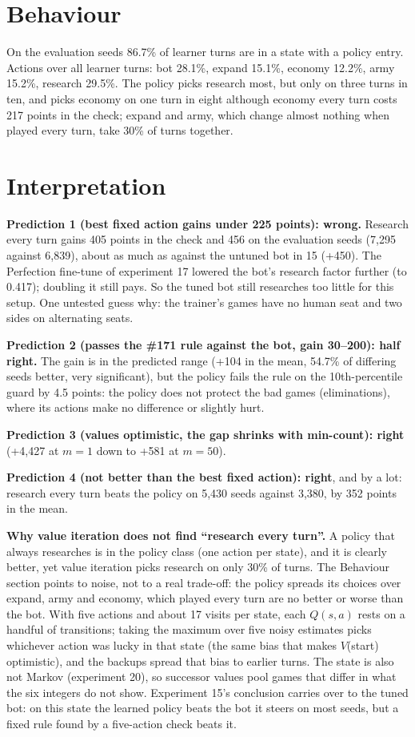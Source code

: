 \documentclass{../polyexp}
\begin{document}
\section{Behaviour}
On the evaluation seeds 86.7\% of learner turns are in a state with a policy entry. Actions over all learner turns:
bot 28.1\%, expand 15.1\%, economy 12.2\%, army 15.2\%, research 29.5\%. The policy picks research most, but only on
three turns in ten, and picks economy on one turn in eight although economy every turn costs 217 points in the
check; expand and army, which change almost nothing when played every turn, take 30\% of turns together.

\section{Interpretation}
\textbf{Prediction 1 (best fixed action gains under 225 points): wrong.} Research every turn gains 405 points in
the check and 456 on the evaluation seeds (7{,}295 against 6{,}839), about as much as against the untuned bot in 15
(+450). The Perfection fine-tune of experiment 17 lowered the bot's research factor further (to 0.417); doubling it
still pays. So the tuned bot still researches too little for this setup. One untested guess why: the trainer's
games have no human seat and two sides on alternating seats.

\textbf{Prediction 2 (passes the \#171 rule against the bot, gain 30--200): half right.} The gain is in the
predicted range (+104 in the mean, 54.7\% of differing seeds better, very significant), but the policy fails the
rule on the 10th-percentile guard by 4.5 points: the policy does not protect the bad games (eliminations), where
its actions make no difference or slightly hurt.

\textbf{Prediction 3 (values optimistic, the gap shrinks with min-count): right} (+4{,}427 at $m=1$ down to +581 at
$m=50$).

\textbf{Prediction 4 (not better than the best fixed action): right}, and by a lot: research every turn beats the
policy on 5{,}430 seeds against 3{,}380, by 352 points in the mean.

\textbf{Why value iteration does not find ``research every turn''.} A policy that always researches is in the
policy class (one action per state), and it is clearly better, yet value iteration picks research on only 30\% of
turns. The Behaviour section points to noise, not to a real trade-off: the policy spreads its choices over expand,
army and economy, which played every turn are no better or worse than the bot. With five actions and about 17
visits per state, each $Q(s,a)$ rests on a handful of transitions; taking the maximum over five noisy estimates
picks whichever action was lucky in that state (the same bias that makes $V$(start) optimistic), and the backups
spread that bias to earlier turns. The state is also not Markov (experiment 20), so successor values pool games
that differ in what the six integers do not show. Experiment 15's conclusion carries over to the tuned bot: on this
state the learned policy beats the bot it steers on most seeds, but a fixed rule found by a five-action check beats
it.
\end{document}
